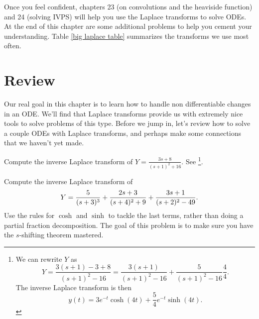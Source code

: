 Once you feel confident, chapters 23 (on convolutions and the heaviside function) and 24 (solving IVPS) will help you use the Laplace transforms to solve ODEs. At the end of this chapter are some additional problems to help you cement your understanding. Table \ref{big laplace table} summarizes the transforms we use most often.

\section{Review}
Our real goal in this chapter is to learn how to handle non differentiable changes in an ODE.  We'll find that Laplace transforms provide us with extremely nice tools to solve problems of this type.  Before we jump in, let's review how to solve a couple ODEs with Laplace transforms, and perhaps make some connections that we haven't yet made. 

\begin{review*}
 Compute the inverse Laplace transform of $Y = \frac{3s+8}{(s+1)^2+16}$. See
\footnote{
We can rewrite $Y$ as 
$$Y 
= \frac{3(s+1)-3+8}{(s+1)^2-16}
= \frac{3(s+1)}{(s+1)^2-16}+\frac{5}{(s+1)^2-16}\frac44.
$$
The inverse Laplace transform is then 
$$y(t) = 3e^{-t}\cosh(4t)+\frac{5}{4}e^{-t}\sinh(4t).$$
}.
\end{review*}


\begin{problem}
%
 Compute the inverse Laplace transform of $$\displaystyle Y =\frac{5}{(s+3)^3} + \frac{2s+3}{(s+4)^2+9} + \frac{3s+1}{(s+2)^2-49}.$$ 
Use the rules for $\cosh$ and $\sinh$ to tackle the last terms, rather than doing a partial fraction decomposition.  The goal of this problem is to make sure you have the $s$-shifting theorem mastered.
\end{problem}

